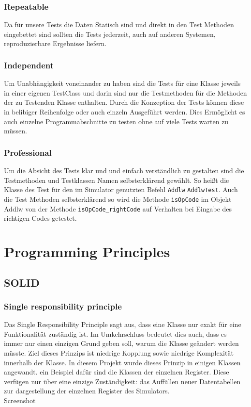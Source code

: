 \documentclass[12pt,a4paper,titlepage,ngerman,pdftex]{report}
\begin{document}
    \subsubsection{Repeatable}
    Da für unsere Tests die Daten Statisch sind und direkt in den Test Methoden eingebettet sind sollten die Tests jederzeit,  auch auf anderen Systemen, reproduzierbare Ergebnisse liefern.

    \subsubsection{Independent}
	Um Unabhängigkeit voneinander zu haben sind die Tests für eine Klasse jeweils in einer eigenen TestClass und darin sind nur die Testmethoden für die Methoden der zu Testenden Klasse enthalten.
 	Durch die Konzeption der Tests können diese in belibiger Reihenfolge oder auch einzeln Ausgeführt werden. 
 	Dies Ermöglicht es auch einzelne Programmabschnitte zu testen ohne auf viele Tests warten zu müssen.
    \subsubsection{Professional}
    Um die Absicht des Tests klar und und einfach verständlich zu gestalten sind die Testmethoden und Testklassen Namen selbsterklärend gewählt. 
    So heißt die Klasse des Test für den im Simulator genutzten Befehl \verb|Addlw|  \verb|AddlwTest|.
    Auch die Test Methoden selbsterklärend so wird die Methode \verb|isOpCode| im Objekt Addlw von der Methode \verb|isOpCode_rightCode| auf Verhalten bei Eingabe des richtigen Codes getestet.

    \section{Programming Principles}

    \subsection{SOLID}\label{subsec:solid}
    
    \subsubsection{Single responsibility principle}\label{subsubsec:single_responsibility}
    Das Single Responsibility Principle sagt aus, dass eine Klasse nur exakt für eine Funktionalität zuständig ist. Im Umkehrschluss bedeutet dies auch, dass es immer nur einen einzigen Grund geben soll, warum die Klasse geändert werden müsste.
    Ziel dieses Prinzips ist niedrige Kopplung sowie niedrige Komplexität innerhalb der Klasse. In diesem Projekt wurde dieses Prinzip in einigen Klassen angewandt. ein Beispiel dafür sind die Klassen der einzelnen Register. 
    Diese verfügen nur über eine einzige Zuständigkeit: das Auffüllen neuer Datentabellen zur dargestellung der einzelnen Register des Simulators.
    \\
    Screenshot
    \\
\end{document}

